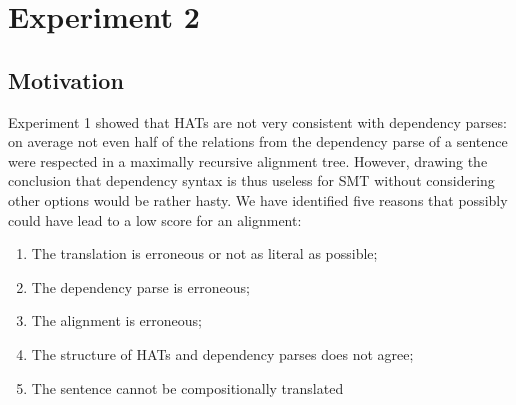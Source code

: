 \documentclass[a4paper, 11pt]{report}
\theoremstyle{definition}
\theoremstyle{plain}
\begin{document}

\section{Experiment 2}

\subsection{Motivation}

Experiment 1 showed that HATs are not very consistent with dependency parses: on average not even half of the relations from the dependency parse of a sentence were respected in a maximally recursive alignment tree. However, drawing the conclusion that dependency syntax is thus useless for SMT without considering other options would be rather hasty. We have identified five reasons that possibly could have lead to a low score for an alignment:

\begin{enumerate}
\item The translation is erroneous or not as literal as possible;
\item The dependency parse is erroneous;
\item The alignment is erroneous;
\item The structure of HATs and dependency parses does not agree;
\item The sentence cannot be compositionally translated
\end{enumerate}
\end{document}
